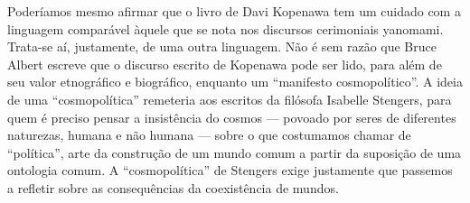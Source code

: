 \documentclass{article}
\begin{document}
Poder\'iamos mesmo afirmar que o livro de Davi Kopenawa tem um cuidado
com a linguagem compar\'avel \`aquele que se nota nos discursos
cerimoniais yanomami. Trata-se a\'i, justamente, de uma outra
linguagem. N\~ao \'e sem raz\~ao que Bruce Albert escreve que o
discurso escrito de Kopenawa pode ser lido, para al\'em de seu valor
etnogr\'afico e biogr\'afico, enquanto um {\textquotedblleft}manifesto
cosmopol\'itico{\textquotedblright}. A ideia de uma
{\textquotedblleft}cosmopol\'itica{\textquotedblright} remeteria aos
escritos da fil\'osofa Isabelle Stengers, para quem \'e preciso pensar
a insist\^encia do cosmos --- povoado por seres de diferentes
naturezas, humana e n\~ao humana --- sobre o que costumamos chamar de
{\textquotedblleft}pol\'itica{\textquotedblright}, arte da
constru\c{c}\~ao de um mundo comum a partir da suposi\c{c}\~ao de uma
ontologia comum. A
{\textquotedblleft}cosmopol\'itica{\textquotedblright} de Stengers
exige justamente que passemos a refletir sobre as consequ\^encias da
coexist\^encia de mundos.
\end{document}
